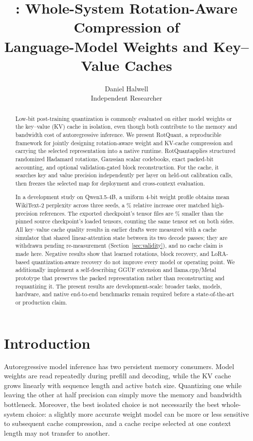 \documentclass[10pt,twocolumn]{article}
\title{\method: Whole-System Rotation-Aware Compression of\\
Language-Model Weights and Key--Value Caches}
\author{
  Daniel Halwell\\
  Independent Researcher\\
  \texttt{\todo{email}}
  \and
  \todo{additional authors and affiliations}
}
\date{}
\newcommand{\method}{RotQuant}
\begin{document}
\maketitle

\begin{abstract}
Low-bit post-training quantization is commonly evaluated on either model
weights or the key--value (KV) cache in isolation, even though both contribute
to the memory and bandwidth cost of autoregressive inference. We present
\method, a reproducible framework for jointly designing rotation-aware weight
and KV-cache compression and carrying the selected representation into a native
runtime. \method applies structured randomized Hadamard rotations, Gaussian
scalar codebooks, exact packed-bit accounting, and optional validation-gated
block reconstruction. For the cache, it searches key and value precision
independently per layer on held-out calibration calls, then freezes the selected
map for deployment and cross-context evaluation.

In a development study on Qwen3.5-4B, a uniform 4-bit weight profile obtains
mean WikiText-2 perplexity \QwenJointMeanPPL{} across three seeds, a
\QwenJointMeanRelativePct\% relative increase over matched high-precision
references. The exported checkpoint's tensor files are
\LikeForLikeTensorReductionPct\% smaller than the pinned source checkpoint's
loaded tensors, counting the same tensor set on both sides. All key--value
cache quality results in earlier drafts were measured with a cache simulator
that shared linear-attention state between its two decode passes; they are
withdrawn pending re-measurement (Section~\ref{sec:validity}), and no cache
claim is made here. Negative
results show that learned rotations, block recovery, and LoRA-based
quantization-aware recovery do not improve every model or operating point.
We additionally implement a self-describing GGUF extension and llama.cpp/Metal
prototype that preserves the packed representation rather than reconstructing
and requantizing it. The present results are development-scale: broader tasks,
models, hardware, and native end-to-end benchmarks remain required before a
state-of-the-art or production claim.
\end{abstract}

\section{Introduction}

Autoregressive model inference has two persistent memory consumers. Model
weights are read repeatedly during prefill and decoding, while the KV cache
grows linearly with sequence length and active batch size. Quantizing one while
leaving the other at half precision can simply move the memory and bandwidth
bottleneck. Moreover, the best isolated choice is not necessarily the best
whole-system choice: a slightly more accurate weight model can be more or less
sensitive to subsequent cache compression, and a cache recipe selected at one
context length may not transfer to another.
\end{document}
